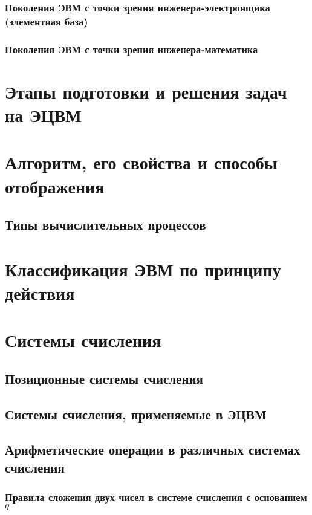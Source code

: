 \documentclass[10pt,a4paper,titlepage]{article}
\begin{document}
\subsubsection{Поколения ЭВМ с точки зрения инженера-электронщика (элементная база)}

\subsubsection{Поколения ЭВМ с точки зрения инженера-математика}

\newpage
\section{Этапы подготовки и решения задач на ЭЦВМ}

\newpage
\section{Алгоритм, его свойства и способы отображения}

\subsection{Типы вычислительных процессов}

\newpage
\section{Классификация ЭВМ по принципу действия}

\newpage
\section{Системы счисления}

\subsection{Позиционные системы счисления}

\subsection{Системы счисления, применяемые в ЭЦВМ}

\subsection{Арифметические операции в различных системах счисления}

\subsubsection{Правила сложения двух чисел в системе счисления с основанием $q$}
\end{document}
